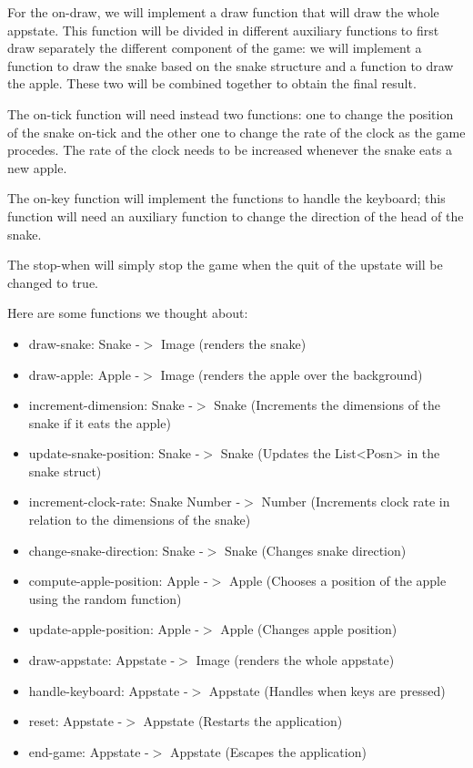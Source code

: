 \documentclass{article}
\begin{document}
	For the on-draw, we will implement a draw function that will draw the whole appstate. This function will be divided in different auxiliary functions to first draw separately the different component of the game: we will implement a function to draw the snake based on the snake structure and a function to draw the apple. These two will be combined together to obtain the final result.
	
	The on-tick function will need instead two functions: one to change the position of the snake on-tick and the other one to change the rate of the clock as the game procedes. The rate of the clock needs to be increased whenever the snake eats a new apple.
	
	The on-key function will implement the functions to handle the keyboard; this function will need an auxiliary function to change the direction of the head of the snake.
	
	The stop-when will simply stop the game when the quit of the upstate will be changed to true.
	
	Here are some functions we thought about:
	\begin{itemize}
		\item draw-snake: Snake -$>$ Image (renders the snake)
		\item draw-apple: Apple -$>$ Image (renders the apple over the background)
		\item increment-dimension: Snake -$>$ Snake (Increments the dimensions of the snake if it eats the apple)
		\item update-snake-position: Snake -$>$ Snake (Updates the List<Posn> in the snake struct)
		\item increment-clock-rate: Snake Number -$>$ Number (Increments clock rate in relation to the dimensions of the snake)
		\item change-snake-direction: Snake -$>$ Snake (Changes snake direction)
		\item compute-apple-position: Apple -$>$ Apple (Chooses a position of the apple using the random function)
		\item update-apple-position: Apple -$>$ Apple (Changes apple position)
		\item draw-appstate: Appstate -$>$ Image (renders the whole appstate)
		\item handle-keyboard: Appstate -$>$ Appstate (Handles when keys are pressed)
		\item reset: Appstate -$>$ Appstate (Restarts the application)
		\item end-game: Appstate -$>$ Appstate (Escapes the application)
	\end{itemize}
\end{document}
